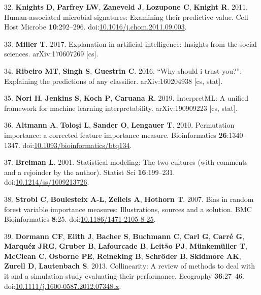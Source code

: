 \documentclass[11pt,]{article}
\begin{document}
\hypertarget{ref-knights_human-associated_2011}{}
32. \textbf{Knights D}, \textbf{Parfrey LW}, \textbf{Zaneveld J},
\textbf{Lozupone C}, \textbf{Knight R}. 2011. Human-associated microbial
signatures: Examining their predictive value. Cell Host Microbe
\textbf{10}:292--296.
doi:\href{https://doi.org/10.1016/j.chom.2011.09.003}{10.1016/j.chom.2011.09.003}.

\hypertarget{ref-miller_explanation_2017}{}
33. \textbf{Miller T}. 2017. Explanation in artificial intelligence:
Insights from the social sciences. arXiv:170607269 {[}cs{]}.

\hypertarget{ref-ribeiro_why_2016}{}
34. \textbf{Ribeiro MT}, \textbf{Singh S}, \textbf{Guestrin C}. 2016.
``Why should i trust you?'': Explaining the predictions of any
classifier. arXiv:160204938 {[}cs, stat{]}.

\hypertarget{ref-nori_interpretml:_2019}{}
35. \textbf{Nori H}, \textbf{Jenkins S}, \textbf{Koch P},
\textbf{Caruana R}. 2019. InterpretML: A unified framework for machine
learning interpretability. arXiv:190909223 {[}cs, stat{]}.

\hypertarget{ref-10.1093ux2fbioinformaticsux2fbtq134}{}
36. \textbf{Altmann A}, \textbf{Toloşi L}, \textbf{Sander O},
\textbf{Lengauer T}. 2010. Permutation importance: a corrected feature
importance measure. Bioinformatics \textbf{26}:1340--1347.
doi:\href{https://doi.org/10.1093/bioinformatics/btq134}{10.1093/bioinformatics/btq134}.

\hypertarget{ref-breiman_statistical_2001}{}
37. \textbf{Breiman L}. 2001. Statistical modeling: The two cultures
(with comments and a rejoinder by the author). Statist Sci
\textbf{16}:199--231.
doi:\href{https://doi.org/10.1214/ss/1009213726}{10.1214/ss/1009213726}.

\hypertarget{ref-strobl_bias_2007}{}
38. \textbf{Strobl C}, \textbf{Boulesteix A-L}, \textbf{Zeileis A},
\textbf{Hothorn T}. 2007. Bias in random forest variable importance
measures: Illustrations, sources and a solution. BMC Bioinformatics
\textbf{8}:25.
doi:\href{https://doi.org/10.1186/1471-2105-8-25}{10.1186/1471-2105-8-25}.

\hypertarget{ref-dormann_collinearity:_2013}{}
39. \textbf{Dormann CF}, \textbf{Elith J}, \textbf{Bacher S},
\textbf{Buchmann C}, \textbf{Carl G}, \textbf{Carré G}, \textbf{Marquéz
JRG}, \textbf{Gruber B}, \textbf{Lafourcade B}, \textbf{Leitão PJ},
\textbf{Münkemüller T}, \textbf{McClean C}, \textbf{Osborne PE},
\textbf{Reineking B}, \textbf{Schröder B}, \textbf{Skidmore AK},
\textbf{Zurell D}, \textbf{Lautenbach S}. 2013. Collinearity: A review
of methods to deal with it and a simulation study evaluating their
performance. Ecography \textbf{36}:27--46.
doi:\href{https://doi.org/10.1111/j.1600-0587.2012.07348.x}{10.1111/j.1600-0587.2012.07348.x}.
\end{document}
